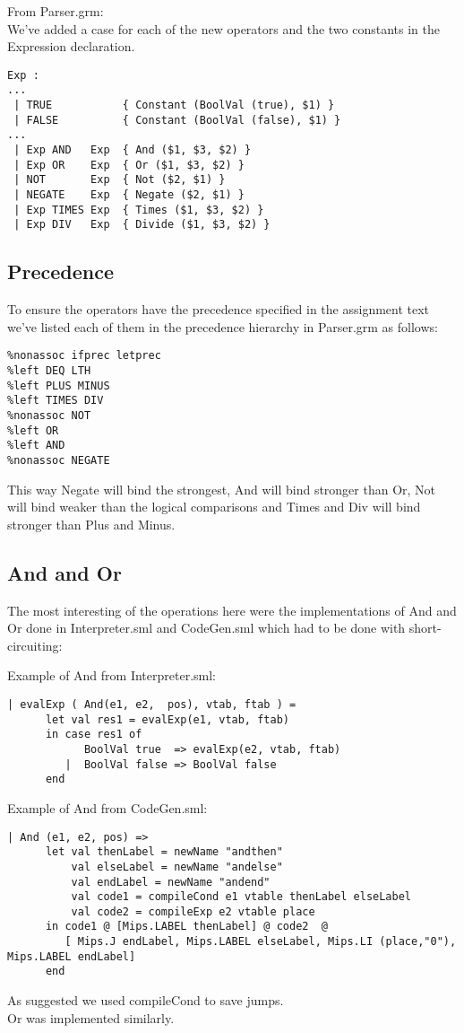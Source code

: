 \documentclass{article}
\begin{document}
\noindent From Parser.grm:\\
\noindent We've added a case for each of the new operators and the two constants in the Expression declaration.
\begin{lstlisting}
Exp :
...
 | TRUE           { Constant (BoolVal (true), $1) }
 | FALSE          { Constant (BoolVal (false), $1) }
...
 | Exp AND   Exp  { And ($1, $3, $2) }
 | Exp OR    Exp  { Or ($1, $3, $2) }
 | NOT       Exp  { Not ($2, $1) }
 | NEGATE    Exp  { Negate ($2, $1) }
 | Exp TIMES Exp  { Times ($1, $3, $2) }
 | Exp DIV   Exp  { Divide ($1, $3, $2) }
\end{lstlisting}

\subsection{Precedence}
To ensure the operators have the precedence specified in the assignment text we've listed each of them in the precedence hierarchy in Parser.grm as follows: 
\begin{lstlisting}
%nonassoc ifprec letprec
%left DEQ LTH
%left PLUS MINUS
%left TIMES DIV
%nonassoc NOT
%left OR
%left AND
%nonassoc NEGATE
\end{lstlisting}
This way Negate will bind the strongest, And will bind stronger than Or, Not will bind weaker than the logical comparisons and Times and Div will bind stronger than Plus and Minus.

\subsection{And and Or}
The most interesting of the operations here were the implementations of And and Or done in Interpreter.sml and CodeGen.sml
which had to be done with short-circuiting:

\noindent Example of And from Interpreter.sml:
\begin{lstlisting}
| evalExp ( And(e1, e2,  pos), vtab, ftab ) =
      let val res1 = evalExp(e1, vtab, ftab)
      in case res1 of
            BoolVal true  => evalExp(e2, vtab, ftab)
         |  BoolVal false => BoolVal false
      end
\end{lstlisting}

\noindent Example of And from CodeGen.sml:
\begin{lstlisting}
| And (e1, e2, pos) =>
      let val thenLabel = newName "andthen"
          val elseLabel = newName "andelse"
          val endLabel = newName "andend"
          val code1 = compileCond e1 vtable thenLabel elseLabel
          val code2 = compileExp e2 vtable place
      in code1 @ [Mips.LABEL thenLabel] @ code2  @
         [ Mips.J endLabel, Mips.LABEL elseLabel, Mips.LI (place,"0"), Mips.LABEL endLabel]
      end
\end{lstlisting}
\noindent As suggested we used compileCond to save jumps.
\\
Or was implemented similarly.
\end{document}
